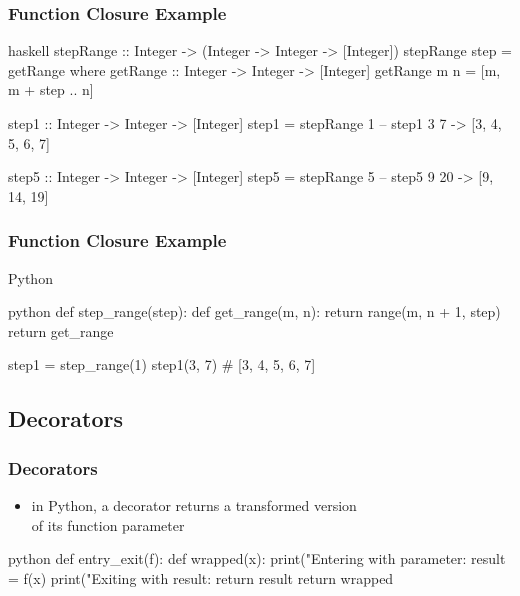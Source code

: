 \documentclass[dvipsnames]{beamer}
\theoremstyle{plain}
\begin{document}
\begin{frame}[fragile]
  \frametitle{Function Closure Example}

  \begin{exampleblock}{}
    \begin{pygments}{haskell}
stepRange :: Integer ->
                (Integer -> Integer -> [Integer])
stepRange step = getRange
  where
    getRange :: Integer -> Integer -> [Integer]
    getRange m n = [m, m + step .. n]

step1 :: Integer -> Integer -> [Integer]
step1 = stepRange 1
-- step1 3 7 -> [3, 4, 5, 6, 7]

step5 :: Integer -> Integer -> [Integer]
step5 = stepRange 5
-- step5 9 20 -> [9, 14, 19]
    \end{pygments}
  \end{exampleblock}
\end{frame}

\begin{frame}[fragile]
  \frametitle{Function Closure Example}

  \begin{exampleblock}{Python}
    \begin{pygments}{python}
def step_range(step):
    def get_range(m, n):
        return range(m, n + 1, step)
    return get_range

step1 = step_range(1)
step1(3, 7)            # [3, 4, 5, 6, 7]
    \end{pygments}
  \end{exampleblock}
\end{frame}

\subsection{Decorators}

\begin{frame}[fragile]
  \frametitle{Decorators}

  \begin{itemize}
    \item in Python, a decorator returns a transformed version\\
      of its function parameter
  \end{itemize}

  \begin{exampleblock}{}
    \begin{pygments}{python}
def entry_exit(f):
    def wrapped(x):
        print("Entering with parameter: %
        result = f(x)
        print("Exiting with result: %
        return result
    return wrapped
    \end{pygments}
  \end{exampleblock}
\end{frame}
\end{document}
